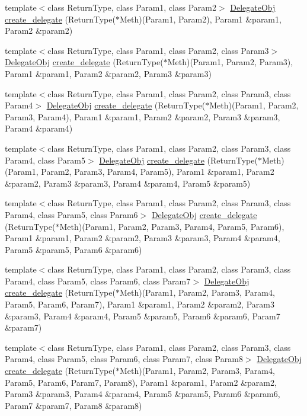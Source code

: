 \begin{CompactItemize}
\item 
template$<$class Return\-Type, class Param1, class Param2$>$ \hyperlink{namespaceDL_a0}{Delegate\-Obj} \hyperlink{namespaceDL_a26}{create\_\-delegate} (Return\-Type($\ast$Meth)(Param1, Param2), Param1 \&param1, Param2 \&param2)
\item 
template$<$class Return\-Type, class Param1, class Param2, class Param3$>$ \hyperlink{namespaceDL_a0}{Delegate\-Obj} \hyperlink{namespaceDL_a27}{create\_\-delegate} (Return\-Type($\ast$Meth)(Param1, Param2, Param3), Param1 \&param1, Param2 \&param2, Param3 \&param3)
\item 
template$<$class Return\-Type, class Param1, class Param2, class Param3, class Param4$>$ \hyperlink{namespaceDL_a0}{Delegate\-Obj} \hyperlink{namespaceDL_a28}{create\_\-delegate} (Return\-Type($\ast$Meth)(Param1, Param2, Param3, Param4), Param1 \&param1, Param2 \&param2, Param3 \&param3, Param4 \&param4)
\item 
template$<$class Return\-Type, class Param1, class Param2, class Param3, class Param4, class Param5$>$ \hyperlink{namespaceDL_a0}{Delegate\-Obj} \hyperlink{namespaceDL_a29}{create\_\-delegate} (Return\-Type($\ast$Meth)(Param1, Param2, Param3, Param4, Param5), Param1 \&param1, Param2 \&param2, Param3 \&param3, Param4 \&param4, Param5 \&param5)
\item 
template$<$class Return\-Type, class Param1, class Param2, class Param3, class Param4, class Param5, class Param6$>$ \hyperlink{namespaceDL_a0}{Delegate\-Obj} \hyperlink{namespaceDL_a30}{create\_\-delegate} (Return\-Type($\ast$Meth)(Param1, Param2, Param3, Param4, Param5, Param6), Param1 \&param1, Param2 \&param2, Param3 \&param3, Param4 \&param4, Param5 \&param5, Param6 \&param6)
\item 
template$<$class Return\-Type, class Param1, class Param2, class Param3, class Param4, class Param5, class Param6, class Param7$>$ \hyperlink{namespaceDL_a0}{Delegate\-Obj} \hyperlink{namespaceDL_a31}{create\_\-delegate} (Return\-Type($\ast$Meth)(Param1, Param2, Param3, Param4, Param5, Param6, Param7), Param1 \&param1, Param2 \&param2, Param3 \&param3, Param4 \&param4, Param5 \&param5, Param6 \&param6, Param7 \&param7)
\item 
template$<$class Return\-Type, class Param1, class Param2, class Param3, class Param4, class Param5, class Param6, class Param7, class Param8$>$ \hyperlink{namespaceDL_a0}{Delegate\-Obj} \hyperlink{namespaceDL_a32}{create\_\-delegate} (Return\-Type($\ast$Meth)(Param1, Param2, Param3, Param4, Param5, Param6, Param7, Param8), Param1 \&param1, Param2 \&param2, Param3 \&param3, Param4 \&param4, Param5 \&param5, Param6 \&param6, Param7 \&param7, Param8 \&param8)

\end{CompactItemize}
